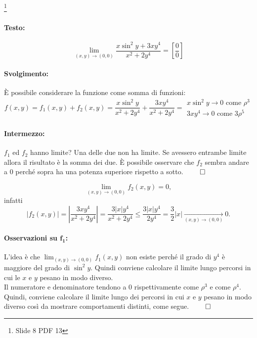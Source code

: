 \begin{example}\footnote{Slide 8 PDF 13}
	\paragraph{Testo:}
	\begin{equation*}
		\lim_{(x,y)\rightarrow(0,0)} \frac{x\sin^2y+3xy^4}{x^2+2y^4}=\left[\frac{0}{0}\right]
	\end{equation*}
	\paragraph{Svolgimento:} È possibile considerare la funzione come somma di funzioni:
	\begin{equation*}
		f(x,y)=f_1(x,y)+f_2(x,y) = \frac{x\sin^2y}{x^2+2y^4} + \frac{3xy^4}{x^2+2y^4} = 
		\begin{matrix}
			x\sin^2y\rightarrow 0 \text{ come } \rho^3\\
			3xy^4\rightarrow 0 \text{ come } 3\rho^5
		\end{matrix}
	\end{equation*}
	
	\paragraph{Intermezzo:} $f_1$ ed $f_2$ hanno limite? Una delle due non ha limite. Se avessero entrambe limite allora il risultato è la somma dei due. È possibile osservare che $f_2$ sembra andare a 0 perché sopra ha una potenza superiore rispetto a sotto. $\qed$
	
	\begin{equation*}
		\lim_{(x,y)\rightarrow(0,0)} f_2(x,y) = 0,
	\end{equation*}
	infatti
	\begin{equation*}
		|f_2(x,y)|=\left|\frac{3xy^4}{x^2+2y^4}\right| = \frac{3|x|y^4}{x^2+2y^4} \leq \frac{3|x|y^4}{2y^4}=\frac{3}{2}|x|\underset{(x,y)\rightarrow(0,0)}{\longrightarrow} 0.
	\end{equation*}
	
	\paragraph{Osservazioni su $\boldsymbol{f_1}$:} L'idea è che $	\lim_{(x,y)\rightarrow(0,0)} f_1(x,y)$ non esiste perché il grado di $y^4$ è maggiore del grado di $\sin^2y$. Quindi conviene calcolare il limite lungo percorsi in cui le $x$ e $y$ pesano in modo diverso.\\
	Il numeratore e denominatore tendono a 0 rispettivamente come $\rho^3$ e come $\rho^4$. Quindi, conviene calcolare il limite lungo dei percorsi in cui $x$ e $y$ pesano in modo diverso così da mostrare comportamenti distinti, come segue. $\qed$


\end{example}
